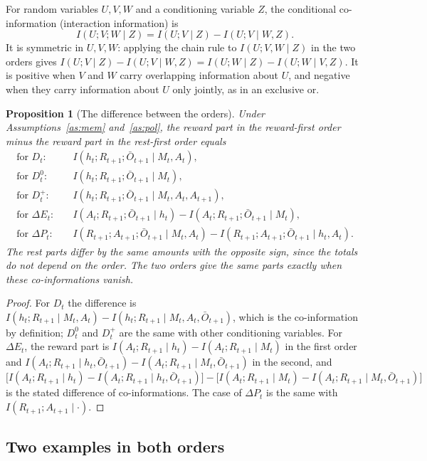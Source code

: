 \documentclass{article}
\newtheorem{proposition}{Proposition}
\theoremstyle{definition}
\theoremstyle{remark}
\newcommand{\dE}{\Delta E}
\newcommand{\dP}{\Delta P}
\newcommand{\Ob}{\bar O}
\begin{document}
For random variables $U,V,W$ and a conditioning variable $Z$, the conditional co-information (interaction information) is
\[
I(U;V;W\mid Z)=I(U;V\mid Z)-I(U;V\mid W,Z).
\]
It is symmetric in $U,V,W$: applying the chain rule to $I(U;V,W\mid Z)$ in the two orders gives $I(U;V\mid Z)-I(U;V\mid W,Z)=I(U;W\mid Z)-I(U;W\mid V,Z)$. It is positive when $V$ and $W$ carry overlapping information about $U$, and negative when they carry information about $U$ only jointly, as in an exclusive or.

\begin{proposition}[The difference between the orders]\label{prop:orders}
Under Assumptions~\ref{as:mem} and~\ref{as:pol}, the reward part in the reward-first order minus the reward part in the rest-first order equals
\begin{align*}
\text{for } D_t:&\quad I(h_t;R_{t+1};\Ob_{t+1}\mid M_t,A_t),\\
\text{for } D^0_t:&\quad I(h_t;R_{t+1};\Ob_{t+1}\mid M_t),\\
\text{for } D^+_t:&\quad I(h_t;R_{t+1};\Ob_{t+1}\mid M_t,A_t,A_{t+1}),\\
\text{for } \dE_t:&\quad I(A_t;R_{t+1};\Ob_{t+1}\mid h_t)-I(A_t;R_{t+1};\Ob_{t+1}\mid M_t),\\
\text{for } \dP_t:&\quad I(R_{t+1};A_{t+1};\Ob_{t+1}\mid M_t,A_t)-I(R_{t+1};A_{t+1};\Ob_{t+1}\mid h_t,A_t).
\end{align*}
The rest parts differ by the same amounts with the opposite sign, since the totals do not depend on the order. The two orders give the same parts exactly when these co-informations vanish.
\end{proposition}

\begin{proof}
For $D_t$ the difference is $I(h_t;R_{t+1}\mid M_t,A_t)-I(h_t;R_{t+1}\mid M_t,A_t,\Ob_{t+1})$, which is the co-information by definition; $D^0_t$ and $D^+_t$ are the same with other conditioning variables. For $\dE_t$, the reward part is $I(A_t;R_{t+1}\mid h_t)-I(A_t;R_{t+1}\mid M_t)$ in the first order and $I(A_t;R_{t+1}\mid h_t,\Ob_{t+1})-I(A_t;R_{t+1}\mid M_t,\Ob_{t+1})$ in the second, and
\[
\big[I(A_t;R_{t+1}\mid h_t)-I(A_t;R_{t+1}\mid h_t,\Ob_{t+1})\big]-\big[I(A_t;R_{t+1}\mid M_t)-I(A_t;R_{t+1}\mid M_t,\Ob_{t+1})\big]
\]
is the stated difference of co-informations. The case of $\dP_t$ is the same with $I(R_{t+1};A_{t+1}\mid\cdot)$.
\end{proof}

\subsection{Two examples in both orders}
\end{document}
